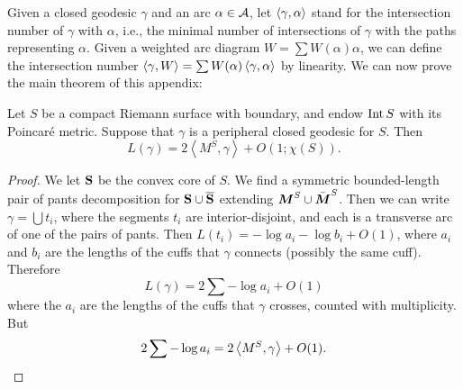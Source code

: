 Given a closed geodesic $\gamma$ and an arc $\alpha\in \AAA$,
let
$\pairing{ \gamma, \alpha }$
stand for the intersection number of $\gamma$ with $\alpha$,
i.e.,
the minimal number of intersections of $\gamma$ with the paths representing $\alpha$.
Given a weighted arc diagram $W=\sum W(\alpha)\alpha$,
we can define the intersection number
$\pairing{ \gamma, W }=\sum W(\alpha)\pairing{ \gamma, \alpha }$
by linearity.
We can now prove the main theorem of this appendix:
\begin{thm} \label{peripheral lengths}
Let $S$ be a compact Riemann surface with boundary,
and endow $\Int S$ with its Poincar\'e metric.
Suppose that $\gamma$ is a peripheral closed geodesic for $S$.
Then
$$
L(\gamma) = 2 \left< M^S, \gamma \right> + O(1; \chi(S)).
$$
\end{thm}

\begin{proof}
We let $\S$ be the convex core of $S$.
We find a symmetric bounded-length pair of pants decomposition for $\S \cup \overline \S$
extending $\M^S\cup \bar \M^S$.
Then we can write $\gamma = \bigcup t_i$,
where the segments $t_i$ are interior-disjoint,
and each is a transverse arc of one of the pairs of pants.
Then $L(t_i) = -\log a_i - \log b_i + O(1)$,
where $a_i$ and $b_i$ are the lengths of the cuffs that $\gamma$ connects
(possibly the same cuff).
Therefore
$$
L(\gamma) = 2 \sum - \log a_i + O(1)
$$
where the $a_i$ are the lengths of the cuffs that $\gamma$ crosses,
counted with multiplicity.
But
\begin{equation}
2 \sum -\log a_i = 2 \left< M^S, \gamma \right> + O(1). \qedhere
\end{equation}
\end{proof}


